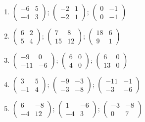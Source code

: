 \begin{enumerate}[label=\arabic*., leftmargin=*, itemsep=1pt]
\item $\left(\begin{smallmatrix}-6 & 5\\ -4 & 3\end{smallmatrix}\right)$; $\left(\begin{smallmatrix}-2 & 1\\ -2 & 1\end{smallmatrix}\right)$; $\left(\begin{smallmatrix}0 & -1\\ 0 & -1\end{smallmatrix}\right)$
\item $\left(\begin{smallmatrix}6 & 2\\ 5 & 4\end{smallmatrix}\right)$; $\left(\begin{smallmatrix}7 & 8\\ 15 & 12\end{smallmatrix}\right)$; $\left(\begin{smallmatrix}18 & 6\\ 9 & 1\end{smallmatrix}\right)$
\item $\left(\begin{smallmatrix}-9 & 0\\ -11 & -6\end{smallmatrix}\right)$; $\left(\begin{smallmatrix}6 & 0\\ 4 & 0\end{smallmatrix}\right)$; $\left(\begin{smallmatrix}6 & 0\\ 13 & 0\end{smallmatrix}\right)$
\item $\left(\begin{smallmatrix}3 & 5\\ -1 & 4\end{smallmatrix}\right)$; $\left(\begin{smallmatrix}-9 & -3\\ -3 & -8\end{smallmatrix}\right)$; $\left(\begin{smallmatrix}-11 & -1\\ -3 & -6\end{smallmatrix}\right)$
\item $\left(\begin{smallmatrix}6 & -8\\ -4 & 12\end{smallmatrix}\right)$; $\left(\begin{smallmatrix}1 & -6\\ -4 & 3\end{smallmatrix}\right)$; $\left(\begin{smallmatrix}-3 & -8\\ 0 & 7\end{smallmatrix}\right)$

\end{enumerate}
